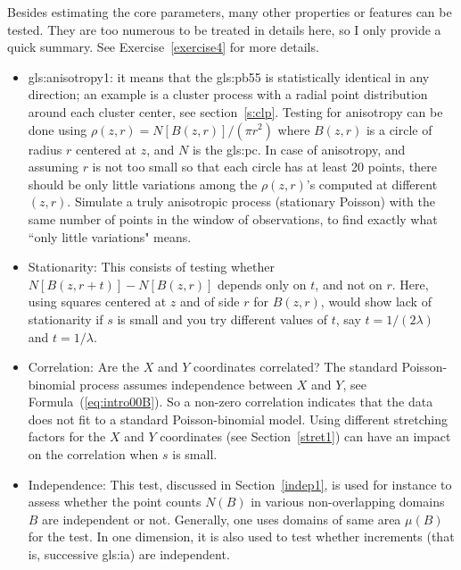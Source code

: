 \documentclass[10pt]{article}
\begin{document}

\noindent Besides estimating the core parameters, many other properties or features can be tested. They are too numerous to be treated in details here, so I only provide a quick
summary. See Exercise~\ref{exercise4} for more details.
\begin{itemize}
\item \Gls{gls:anisotropy1}: it means that the \gls{gls:pb55} is statistically identical in any direction; 
an example is a \textcolor{index}{cluster process} with a radial
point distribution around each cluster center, see section~\ref{s:clp}.  Testing for anisotropy can be done using $\rho(z,r)=N[B(z,r)]/(\pi r^2)$ where $B(z,r)$ is a circle of radius $r$ centered at $z$, and $N$ is the \gls{gls:pc}. In case of anisotropy, and assuming $r$ is not too small so that each circle has at least 20 points, there should be only little variations among the $\rho(z,r)$'s computed at different $(z,r)$.  Simulate a truly anisotropic process (stationary Poisson) with the same number of points in the window of observations, to find exactly what ``only little variations" means.
\item \textcolor{index}{Stationarity}: This consists of testing whether $N[B(z,r+t)]-N[B(z,r)]$ depends only on $t$, and not on $r$. Here, using squares
centered at $z$ and of side $r$ for $B(z,r)$, would show lack of stationarity if $s$ is small and you try different values of $t$, say $t=1/(2\lambda)$ and
$t=1/\lambda$.
\item Correlation: Are the $X$ and $Y$ coordinates correlated? The standard Poisson-binomial process assumes independence between $X$ and $Y$, see
Formula~(\ref{eq:intro00B}). So a non-zero correlation indicates that the data does not fit to a standard Poisson-binomial model. Using different stretching factors for the $X$ and $Y$ coordinates (see Section~\ref{stret1}) can have an impact on the correlation when $s$ is small. 
\item Independence: This test, discussed in Section~\ref{indep1}, is used for instance to assess whether the point counts $N(B)$ in various non-overlapping domains $B$ 
are independent or not. Generally, one uses domains of same area $\mu(B)$ for the test. In one dimension, it is also used to test whether \textcolor{index}{increments} 
(that is, successive \gls{gls:ia}) are independent.

\end{itemize}
\end{document}

